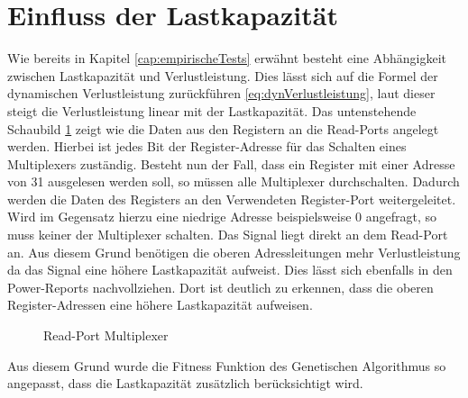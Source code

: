 \section{Einfluss der Lastkapazität}
 \label{cap:lastkapa}
Wie bereits in Kapitel \ref{cap:empirischeTests} erwähnt besteht eine Abhängigkeit zwischen Lastkapazität und Verlustleistung. Dies lässt sich auf die Formel der dynamischen Verlustleistung zurückführen \ref{eq:dynVerlustleistung}, laut dieser steigt die Verlustleistung linear mit der Lastkapazität.
Das untenstehende Schaubild \ref{fig:read_port_mux} zeigt wie die Daten aus den Registern an die Read-Ports angelegt werden. Hierbei ist jedes Bit der Register-Adresse für das Schalten eines Multiplexers zuständig. Besteht nun der Fall, dass ein Register mit einer Adresse von 31 ausgelesen werden soll, so müssen alle Multiplexer durchschalten. Dadurch werden die Daten des Registers an den Verwendeten Register-Port weitergeleitet. Wird im Gegensatz hierzu eine niedrige Adresse beispielsweise 0 angefragt, so muss keiner der Multiplexer schalten. Das Signal liegt direkt an dem Read-Port an. Aus diesem Grund benötigen die oberen Adressleitungen mehr Verlustleistung da das Signal eine höhere Lastkapazität aufweist. Dies lässt sich ebenfalls in den Power-Reports nachvollziehen. Dort ist deutlich zu erkennen, dass die oberen Register-Adressen eine höhere Lastkapazität aufweisen. 
\begin{scriptsize}
	\begin{figure}[htbp] 
		\centering
		
		\caption{Read-Port Multiplexer}
		\label{fig:read_port_mux}
	\end{figure}
\end{scriptsize}

Aus diesem Grund wurde die Fitness Funktion des Genetischen Algorithmus so angepasst, dass die Lastkapazität zusätzlich berücksichtigt wird.
